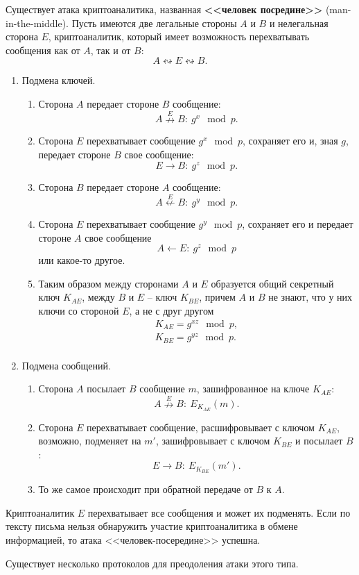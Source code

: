 Существует атака криптоаналитика, названная \textbf{<<человек посредине>>} (man-in-the-middle). Пусть имеются две легальные стороны $A$ и $B$ и нелегальная сторона $E$, криптоаналитик, который имеет возможность перехватывать сообщения как от $A$, так и от $B$:
    \[ A \leftrightsquigarrow E \leftrightsquigarrow B. \]

\begin{enumerate}
    \item Подмена ключей.
        \begin{enumerate}
            \item Сторона $A$ передает стороне $B$ сообщение:
                \[ A \overset{E}{\nrightarrow} B: ~ g^x \mod p. \]
            \item Сторона $E$ перехватывает сообщение $g^x \mod p$, сохраняет его и, зная $g$, передает стороне $B$ свое сообщение:
                \[ E \rightarrow B: ~ g^z \mod p. \]
            \item Сторона $B$ передает стороне $A$ сообщение:
                \[ A \overset{E}{\nleftarrow} B: ~ g^y \mod p. \]
            \item Сторона $E$ перехватывает сообщение $g^y \mod p$, сохраняет его и передает стороне $A$ свое сообщение
                \[ A \leftarrow E: ~ g^z \mod p \]
                или какое-то другое.
            \item Таким образом между сторонами $A$ и $E$ образуется общий секретный ключ $K_{AE}$, между $B$ и $E$ -- ключ $K_{BE}$, причем $A$ и $B$ не знают, что у них ключи со стороной $E$, а не с друг другом
                \[ \begin{array} {l}
                    K_{AE} = g^{xz} \mod p, \\
                    K_{BE} = g^{yz} \mod p. \\
                \end{array} \]

        \end{enumerate}
    \item Подмена сообщений.
        \begin{enumerate}
            \item Сторона $A$ посылает $B$ сообщение $m$, зашифрованное на ключе $K_{AE}$:
                \[ A \overset{E}{\nrightarrow} B: ~ E_{K_{AE}}(m). \]
            \item Сторона $E$ перехватывает сообщение, расшифровывает с ключом $K_{AE}$, возможно, подменяет на $m'$, зашифровывает с ключом $K_{BE}$ и посылает $B$:
                \[ E \rightarrow B: ~ E_{K_{BE}}(m'). \]
            \item То же самое происходит при обратной передаче от $B$ к $A$.
        \end{enumerate}
\end{enumerate}

Криптоаналитик $E$ перехватывает все сообщения и может их подменять. Если по тексту письма нельзя обнаружить участие криптоаналитика в обмене информацией, то атака <<человек-посередине>> успешна.

Существует несколько протоколов для преодоления атаки этого типа.
